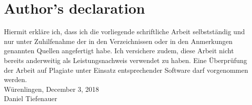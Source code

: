 \section{Author's declaration}
Hiermit erkläre ich, dass ich die vorliegende schriftliche Arbeit
selbstständig und nur unter Zuhilfenahme der in den Verzeichnissen oder
in den Anmerkungen genannten Quellen angefertigt habe. Ich versichere
zudem, diese Arbeit nicht bereits anderweitig als Leistungsnachweis
verwendet zu haben. Eine Überprüfung der Arbeit auf Plagiate unter
Einsatz entsprechender Software darf vorgenommen werden.\\[\baselineskip]

Würenlingen, December 3, 2018 \\[4\baselineskip]
Daniel Tiefenauer